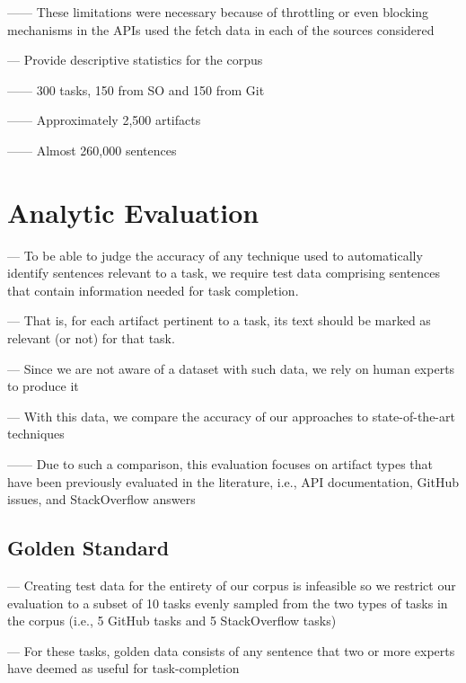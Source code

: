 ------ These limitations were necessary because of throttling or even blocking mechanisms in the APIs used the fetch data in each of the sources considered \vspace{3mm}

--- Provide descriptive statistics for the corpus

------ 300 tasks, 150 from SO and 150 from Git

------ Approximately 2,500 artifacts

------ Almost 260,000 sentences


\section{Analytic Evaluation}

--- To be able to judge the accuracy of any technique used to automatically identify sentences relevant to a task,
we require test data comprising sentences that contain information needed for task completion. \vspace{3mm}


--- That is, for each artifact pertinent to a task, its text should be marked as relevant (or not) for that task. \vspace{3mm}

--- Since we are not aware of a dataset with such data, we rely on human experts to produce it \vspace{3mm}


--- With this data, we compare the accuracy of our approaches to state-of-the-art techniques

------ Due to such a comparison, this evaluation focuses on artifact types that have been previously evaluated in the literature, i.e., API documentation, GitHub issues, and StackOverflow answers



\subsection{Golden Standard}

--- Creating test data for the entirety of our corpus is infeasible so we restrict our evaluation to a subset of 10 tasks evenly sampled from the two types of tasks in the corpus (i.e., 5 GitHub tasks and 5 StackOverflow tasks) \vspace{3mm}

--- For these tasks, golden data consists of any sentence that two or more experts have deemed as useful for task-completion \vspace{3mm}



